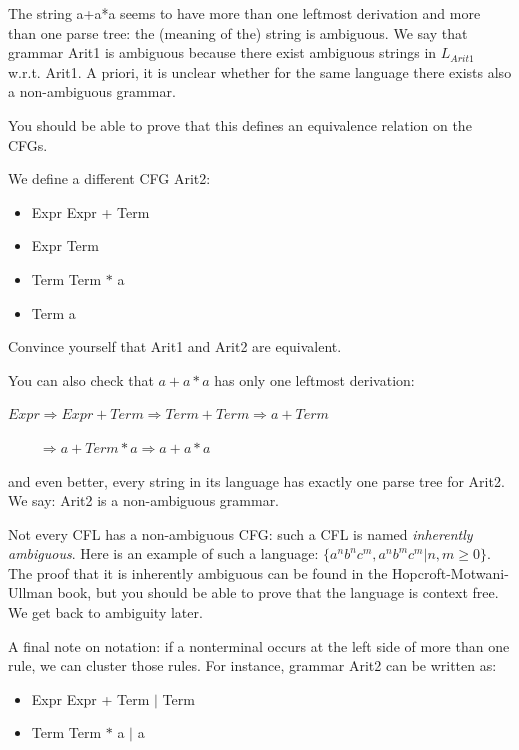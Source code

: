 The string a+a*a seems to have more than one leftmost derivation and
more than one parse tree: the (meaning of the) string is ambiguous.
We say that grammar Arit1 is ambiguous because there exist ambiguous
strings in $L_{Arit1}$ w.r.t. Arit1. A priori, it is unclear whether
for the same language there exists also a non-ambiguous grammar.



You should be able to prove that this defines an equivalence relation
on the CFGs.

We define a different CFG Arit2\label{arit2label}:

\begin{itemize}
\item Expr \rpijl Expr + Term
\item Expr \rpijl Term
\item Term \rpijl Term $*$ a
\item Term \rpijl a
\end{itemize}

Convince yourself that Arit1 and Arit2 are equivalent.

You can also check that $a+a*a$ has only one leftmost derivation:


$Expr \Rightarrow Expr + Term \Rightarrow Term + Term \Rightarrow a + Term$

$~~~~~~~~~~\Rightarrow a + Term * a \Rightarrow a + a * a$


and even better, every string in its language has exactly one parse
tree for Arit2. We say: Arit2 is a non-ambiguous grammar.


Not every CFL has a non-ambiguous CFG: such a CFL is named {\em
  inherently ambiguous}. Here is an example of such a language:
%
$\{a^nb^nc^m, a^nb^mc^m| n,m \geq 0\}$.   The proof that it is
inherently ambiguous can be found in the Hopcroft-Motwani-Ullman book,
but you should be able to prove that the language is context free.
We get back to ambiguity later.

A final note on notation: if a nonterminal occurs at the left side of
more than one rule, we can cluster those rules. For instance, grammar
Arit2 can be written as:
\begin{itemize}
\item Expr \rpijl Expr + Term $|$ Term
\item Term \rpijl Term $*$ a $|$ a
\end{itemize}



